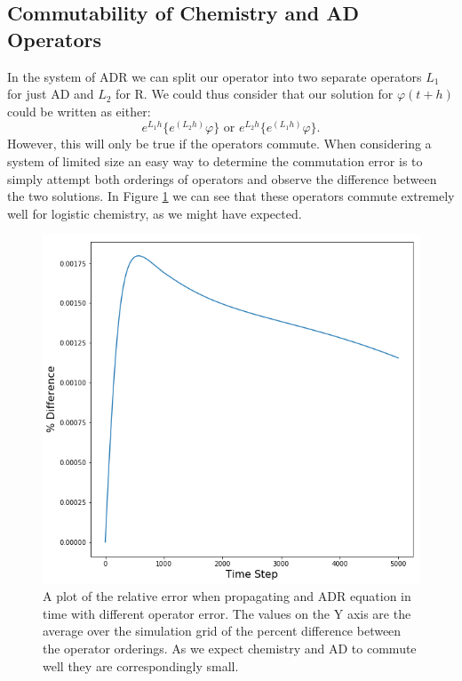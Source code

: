 \documentclass[]{article}
\begin{document}
\subsection{Commutability of Chemistry and AD Operators}
In the system of ADR we can split our operator into two separate operators $L_1$ for just AD and $L_2$ for R. We could thus consider that our solution for $\varphi(t+h)$ could be written as either:
\begin{equation}
e^{L_1h}\{e^{(L_2h)}\varphi\} \text{ or } e^{L_2h}\{e^{(L_1h)}\varphi\}.
\end{equation}
However, this will only be true if the operators commute. When considering a system of limited size an easy way to determine the commutation error is to simply attempt both orderings of operators and observe the difference between the two solutions. In Figure \ref{fig:commute_error} we can see that these operators commute extremely well for logistic chemistry, as we might have expected.
\begin{figure}
	\centering
	\includegraphics[width=\textwidth]{figures/operator_order_rel_dif.png}
	\caption{A plot of the relative error when propagating and ADR equation in time with different operator error. The values on the Y axis are the average over the simulation grid of the percent difference between the operator orderings. As we expect chemistry and AD to commute well they are correspondingly small.  }
	\label{fig:commute_error}
\end{figure}
\end{document}
